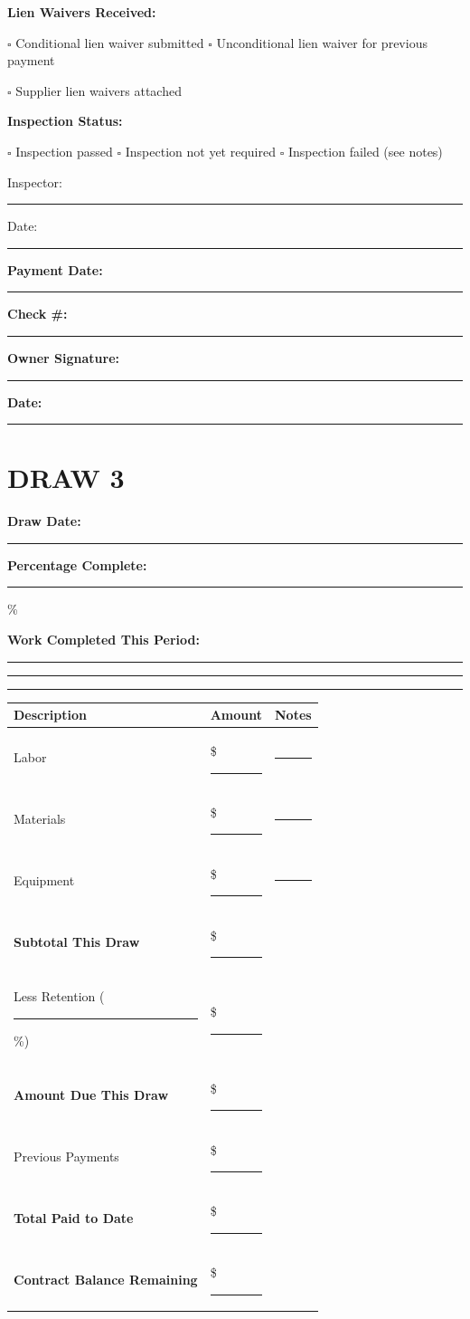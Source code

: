 \documentclass[11pt,letterpaper]{article}
\begin{document}
\vspace{6pt}

\textbf{Lien Waivers Received:}

$\square$ Conditional lien waiver submitted \hspace{0.3in} $\square$ Unconditional lien waiver for previous payment

$\square$ Supplier lien waivers attached

\textbf{Inspection Status:}

$\square$ Inspection passed \hspace{0.3in} $\square$ Inspection not yet required \hspace{0.3in} $\square$ Inspection failed (see notes)

Inspector: \rule{5cm}{0.4pt} Date: \rule{3cm}{0.4pt}

\textbf{Payment Date:} \rule{4cm}{0.4pt} \hspace{0.3in} \textbf{Check \#:} \rule{3cm}{0.4pt}

\textbf{Owner Signature:} \rule{5cm}{0.4pt} \textbf{Date:} \rule{2cm}{0.4pt}

\vspace{12pt}

\section*{DRAW 3}

\textbf{Draw Date:} \rule{4cm}{0.4pt} \hspace{0.5in} \textbf{Percentage Complete:} \rule{2cm}{0.4pt} \%

\textbf{Work Completed This Period:}

\rule{14cm}{0.4pt}

\rule{14cm}{0.4pt}

\rule{14cm}{0.4pt}

\begin{tabular}{|p{3in}|p{1.5in}|p{1.5in}|}
\hline
\textbf{Description} & \textbf{Amount} & \textbf{Notes} \\
\hline
Labor & \$ \rule{1in}{0.4pt} & \rule{1in}{0.4pt} \\
\hline
Materials & \$ \rule{1in}{0.4pt} & \rule{1in}{0.4pt} \\
\hline
Equipment & \$ \rule{1in}{0.4pt} & \rule{1in}{0.4pt} \\
\hline
\textbf{Subtotal This Draw} & \$ \rule{1in}{0.4pt} & \\
\hline
Less Retention (\rule{1cm}{0.4pt}\%) & \$ \rule{1in}{0.4pt} & \\
\hline
\textbf{Amount Due This Draw} & \$ \rule{1in}{0.4pt} & \\
\hline
Previous Payments & \$ \rule{1in}{0.4pt} & \\
\hline
\textbf{Total Paid to Date} & \$ \rule{1in}{0.4pt} & \\
\hline
\textbf{Contract Balance Remaining} & \$ \rule{1in}{0.4pt} & \\
\hline
\end{tabular}
\end{document}
